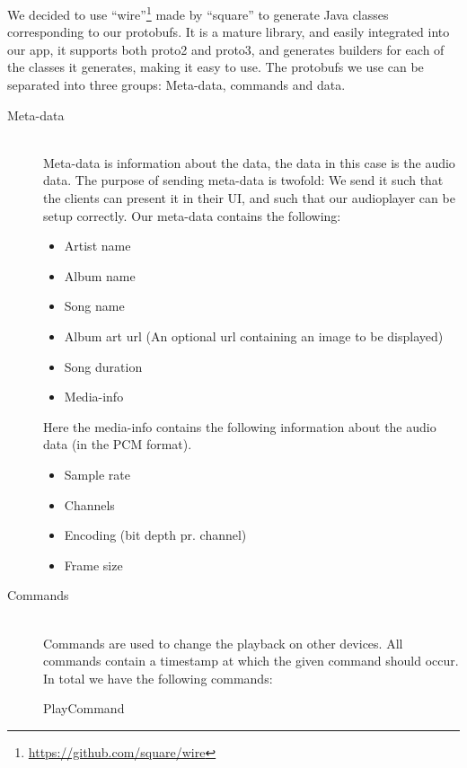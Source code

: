 We decided to use ``wire''\footnote{\url{https://github.com/square/wire}} made by ``square'' to generate Java classes corresponding to our protobufs.
It is a mature library, and easily integrated into our app, it supports both proto2 and proto3, and generates builders for each of the classes it generates, making it easy to use.
The protobufs we use can be separated into three groups: Meta-data, commands and data. 
\begin{description}
    \item[Meta-data] \hfill \\
        Meta-data is information about the data, the data in this case is the audio data.
        The purpose of sending meta-data is twofold: We send it such that the clients can present it in their UI, and such that our audioplayer can be setup correctly.
        Our meta-data contains the following:
        \begin{itemize}
            \item Artist name
            \item Album name
            \item Song name
            \item Album art url (An optional url containing an image to be displayed)
            \item Song duration
            \item Media-info
        \end{itemize}
        Here the media-info contains the following information about the audio data (in the PCM format). 
        \begin{itemize}
            \item Sample rate
            \item Channels
            \item Encoding (bit depth pr. channel)
            \item Frame size
        \end{itemize}
    \item[Commands] \hfill \\
        Commands are used to change the playback on other devices.
        All commands contain a timestamp at which the given command should occur. 
        In total we have the following commands:
        \begin{description}
            \item[PlayCommand]

\end{description}
\end{description}
